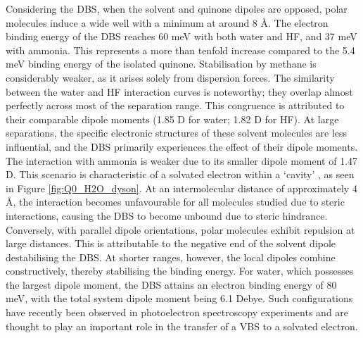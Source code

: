 Considering the DBS, when the solvent and quinone dipoles are opposed, polar molecules induce a wide well with a minimum at around 8 \r{A}. The electron binding energy of the DBS reaches 60 meV with both water and HF, and 37 meV with ammonia. This represents a more than tenfold increase compared to the 5.4 meV binding energy of the isolated quinone. Stabilisation by methane is considerably weaker, as it arises solely from dispersion forces. The similarity between the water and HF interaction curves is noteworthy; they overlap almost perfectly across most of the separation range. This congruence is attributed to their comparable dipole moments (1.85 D for water; 1.82 D for HF). At large separations, the specific electronic structures of these solvent molecules are less influential, and the DBS primarily experiences the effect of their dipole moments. The interaction with ammonia is weaker due to its smaller dipole moment of 1.47 D. This scenario is characteristic of a solvated electron within a `cavity' \cite{jordan2003theory,herbert2019structure}, as seen in Figure \ref{fig:Q0_H2O_dyson}. At an intermolecular distance of approximately 4 \r{A}, the interaction becomes unfavourable for all molecules studied due to steric interactions, causing the DBS to become unbound due to steric hindrance.\\

Conversely, with parallel dipole orientations, polar molecules exhibit repulsion at large distances. This is attributable to the negative end of the solvent dipole destabilising the DBS. At shorter ranges, however, the local dipoles combine constructively, thereby stabilising the binding energy. For water, which possesses the largest dipole moment, the DBS attains an electron binding energy of 80 meV, with the total system dipole moment being 6.1 Debye. Such configurations have recently been observed in photoelectron spectroscopy experiments \cite{clarke2025role} and are thought to play an important role in the transfer of a VBS to a solvated electron.\\

